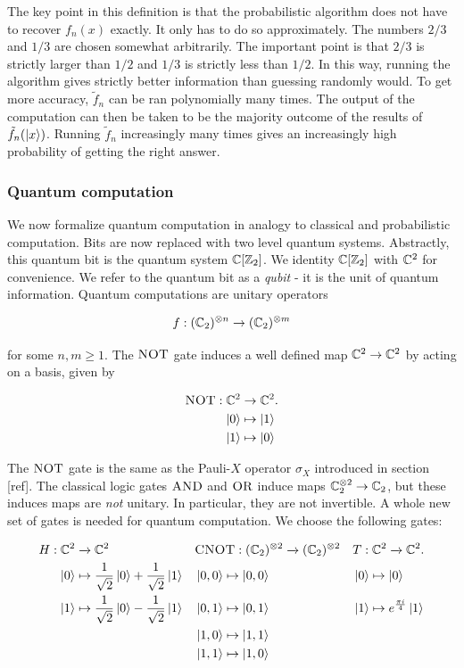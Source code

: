 \documentclass{article}
\theoremstyle{definition}
\numberwithin{figure}{section}
\begin{document}
The key point in this definition is that the probabilistic algorithm does not have to recover $f_n(x)$ exactly. It only has to do so approximately. The numbers $2/3$ and $1/3$ are chosen somewhat arbitrarily. The important point is that $2/3$ is strictly larger than $1/2$ and $1/3$ is strictly less than $1/2$. In this way, running the algorithm gives strictly better information than guessing randomly would. To get more accuracy, $\tilde{f}_n$ can be ran polynomially many times. The output of the computation can then be taken to be the majority outcome of the results of $\tilde{f}_n(\ket{x})$. Running $\tilde{f}_n$ increasingly many times gives an increasingly high probability of getting the right answer.

\subsubsection{Quantum computation}

We now formalize quantum computation in analogy to classical and probabilistic computation. Bits are now replaced with two level quantum systems. Abstractly, this quantum bit is the quantum system $\mathbb{C}[\mathbb{Z}_2]$. We identity $\mathbb{C}[\mathbb{Z}_2]$ with $\mathbb{C}^2$ for convenience. We refer to the quantum bit as a \textit{qubit} - it is the unit of quantum information. Quantum computations are unitary operators

$$f:(\mathbb{C}_2)^{\otimes n}\to (\mathbb{C}_2)^{\otimes m}$$

for some $n,m\geq 1$. The $\textsc{NOT}$ gate induces a well defined map $\mathbb{C}^2\to \mathbb{C}^2$ by acting on a basis, given by

\begin{align*}
\textsc{NOT}:\mathbb{C}^2&\to \mathbb{C}^2.\\
\ket{0}&\mapsto \ket{1}\\
\ket{1}&\mapsto \ket{0}
\end{align*}

The $\textsc{NOT}$ gate is the same as the Pauli-$X$ operator $\sigma_X$ introduced in section [ref]. The classical logic gates $\textsc{AND}$ and $\textsc{OR}$ induce maps $\mathbb{C}_2^{\otimes 2}\to \mathbb{C}_2$, but these induces maps are \textit{not} unitary. In particular, they are not invertible. A whole new set of gates is needed for quantum computation. We choose the following gates:

\begin{align*}
H: \mathbb{C}^2&\xrightarrow{}\mathbb{C}^2 && \textsc{CNOT}: (\mathbb{C}_2)^{\otimes 2}\xrightarrow{}(\mathbb{C}_2)^{\otimes 2}&& T:\mathbb{C}^2 \xrightarrow{}\mathbb{C}^2.\\
\ket{0}&\mapsto \frac{1}{\sqrt{2}}\ket{0}+\frac{1}{\sqrt{2}}\ket{1} && \ket{0,0} \mapsto \ket{0,0} && \ket{0}\mapsto \ket{0}\\
\ket{1}&\mapsto \frac{1}{\sqrt{2}}\ket{0}-\frac{1}{\sqrt{2}}\ket{1} && \ket{0,1}\mapsto \ket{0,1} && \ket{1}\mapsto e^{\frac{\pi i}{4}}\ket{1}\\
& && \ket{1,0}\mapsto \ket{1,1} && \\
& && \ket{1,1}\mapsto \ket{1,0} && \\
\end{align*}
\end{document}
